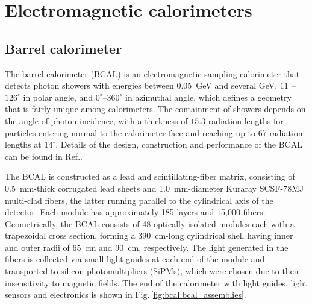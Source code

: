 \section[Electromagnetic calorimeters] {Electromagnetic calorimeters \label{sec:calorimeters}}

\subsection[Barrel calorimeter ]{Barrel calorimeter \label{sec:bcal}}
The barrel calorimeter (BCAL) is an electromagnetic sampling calorimeter that detects photon showers with energies between 0.05~GeV and several GeV, $11^{\circ}$--$126^{\circ}$ in polar angle, and $0^{\circ}$--$360^{\circ}$ in azimuthal angle, which defines a geometry that is fairly unique among calorimeters. The containment of showers depends on the angle of photon incidence, with a thickness of $15.3$ radiation lengths for particles entering normal to the calorimeter face and reaching up to 67 radiation lengths at $14^{\circ}$. Details of the design, construction and performance of the BCAL can be found in Ref.\cite{BEATTIE201824}.

The BCAL is constructed as a lead and  scintillating-fiber matrix, consisting of 0.5~mm-thick corrugated lead sheets and 1.0~mm-diameter Kuraray SCSF-78MJ multi-clad fibers, the latter running parallel to the cylindrical axis of the detector. Each module has approximately 185 layers and 15,000 fibers. Geometrically, the BCAL consists of 48 optically isolated modules each with a trapezoidal cross section, forming a  390~cm-long cylindrical shell having inner and outer radii of 65~cm and 90~cm, respectively. The light generated in the fibers is collected via small light guides at each end of the module and transported to silicon photomultipliers (SiPMs), which were chosen due to their insensitivity to magnetic fields. The end of the calorimeter with light guides, light sensors and electronics is shown in  Fig.\,\ref{fig:bcal:bcal_assemblies}.

